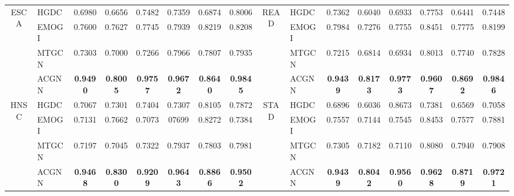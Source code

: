 \begin{table*}[h]
\begin{tabular}{c l ccc ccc  c l ccc ccc}
		\midrule
		\multirow{4}{*}{ESCA} & HGDC & 0.6980 & 0.6656 & 0.7482 & 0.7359 & 0.6874 & 0.8006  & 
		\multirow{4}{*}{READ} & HGDC & 0.7362 & 0.6040 & 0.6933 & 0.7753 & 0.6441 & 0.7448 \\
		& EMOGI & 0.7600 & 0.7627 & 0.7745 & 0.7939 & 0.8219 & 0.8208  & 
		& EMOGI & 0.7984 & 0.7276 & 0.7755 & 0.8451 & 0.7775 & 0.8199 \\
		& MTGCN & 0.7303 & 0.7000 & 0.7266& 0.7966 & 0.7807 & 0.7935 & 
		& MTGCN & 0.7215 & 0.6814 & 0.6934 & 0.8013 & 0.7740& 0.7828 \\
		& ACGNN  & \textbf{0.9490}  & \textbf{0.8005}  & \textbf{0.9757}  & \textbf{0.9672}  & \textbf{0.8640}  & \textbf{0.9845}  & 
		& ACGNN  & \textbf{0.9439}  & \textbf{0.8173}  & \textbf{0.9773}  & \textbf{0.9607}  & \textbf{0.8692}  & \textbf{0.9846}  \\
		\midrule
		\multirow{4}{*}{HNSC} & HGDC & 0.7067 & 0.7301 & 0.7404 & 0.7307 & 0.8105 & 0.7872  & 
		\multirow{4}{*}{STAD} & HGDC & 0.6896 & 0.6036 & 0.8673 & 0.7381 & 0.6569 & 0.7058 \\
		& EMOGI & 0.7131 & 0.7662 & 0.7073 & 07699 & 0.8272 & 0.7384  & 
		& EMOGI & 0.7557 & 0.7144 & 0.7545 & 0.8453& 0.7577 & 0.7881 \\
		& MTGCN & 0.7197 & 0.7045 & 0.7322 & 0.7937& 0.7803 & 0.7981 & 
		& MTGCN & 0.7305 & 0.7182 & 0.7110 & 0.8080 & 0.7940 & 0.7908 \\
		& ACGNN  & \textbf{0.9468}  & \textbf{0.8300}  & \textbf{0.9209}  & \textbf{0.9643}  & \textbf{0.8866}  & \textbf{0.9502}  & 
		& ACGNN  & \textbf{0.9439}  & \textbf{0.8042}  & \textbf{0.9560}  & \textbf{0.9628}  & \textbf{0.8719}  & \textbf{0.9721}  \\
		

\end{tabular}
\end{table*}
